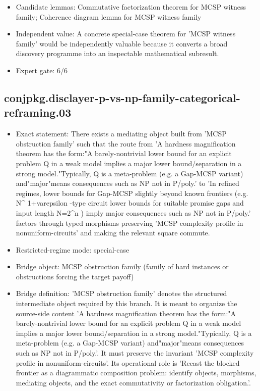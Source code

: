 \documentclass[11pt]{article}
\begin{document}
\begin{itemize}
\item Candidate lemmas: Commutative factorization theorem for MCSP witness family; Coherence diagram lemma for MCSP witness family
\item Independent value: A concrete special-case theorem for 'MCSP witness family' would be independently valuable because it converts a broad discovery programme into an inspectable mathematical subresult.
\item Expert gate: 6/6
\end{itemize}

\subsection*{conjpkg.disclayer-p-vs-np-family-categorical-reframing.03}
\begin{itemize}
\item Exact statement: There exists a mediating object built from 'MCSP obstruction family' such that the route from 'A hardness magnification theorem has the form:"A barely-nontrivial lower bound for an explicit problem Q in a weak model implies a major lower bound/separation in a strong model."Typically, Q is a meta-problem (e.g. a Gap-MCSP variant) and"major"means consequences such as NP not in P/poly.' to 'In refined regimes, lower bounds for Gap-MCSP slightly beyond known frontiers (e.g. N\textasciicircum{} 1+varepsilon -type circuit lower bounds for suitable promise gaps and input length N=2\textasciicircum{}n ) imply major consequences such as NP not in P/poly.' factors through typed morphisms preserving 'MCSP complexity profile in nonuniform-circuits' and making the relevant square commute.
\item Restricted-regime mode: special-case
\item Bridge object: MCSP obstruction family (family of hard instances or obstructions forcing the target payoff)
\item Bridge definition: 'MCSP obstruction family' denotes the structured intermediate object required by this branch. It is meant to organize the source-side content 'A hardness magnification theorem has the form:"A barely-nontrivial lower bound for an explicit problem Q in a weak model implies a major lower bound/separation in a strong model."Typically, Q is a meta-problem (e.g. a Gap-MCSP variant) and"major"means consequences such as NP not in P/poly.'. It must preserve the invariant 'MCSP complexity profile in nonuniform-circuits'. Its operational role is 'Recast the blocked frontier as a diagrammatic composition problem: identify objects, morphisms, mediating objects, and the exact commutativity or factorization obligation.'.

\end{itemize}
\end{document}
